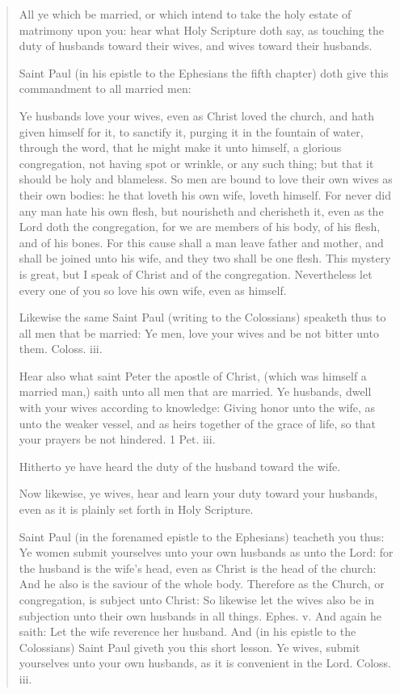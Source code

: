 \documentclass[
]{book}
\begin{document}
\begin{quote}
All ye which be married, or which intend to take the holy estate of matrimony upon you: hear what Holy Scripture doth say, as touching the duty of husbands toward their wives, and wives toward their husbands.

Saint Paul (in his epistle to the Ephesians the fifth chapter) doth give this commandment to all married men:

Ye husbands love your wives, even as Christ loved the church, and hath given himself for it, to sanctify it, purging it in the fountain of water, through the word, that he might make it unto himself, a glorious congregation, not having spot or wrinkle, or any such thing; but that it should be holy and blameless. So men are bound to love their own wives as their own bodies: he that loveth his own wife, loveth himself. For never did any man hate his own flesh, but nourisheth and cherisheth it, even as the Lord doth the congregation, for we are members of his body, of his flesh, and of his bones. For this cause shall a man leave father and mother, and shall be joined unto his wife, and they two shall be one flesh. This mystery is great, but I speak of Christ and of the congregation. Nevertheless let every one of you so love his own wife, even as himself.

Likewise the same Saint Paul (writing to the Colossians) speaketh thus to all men that be married: Ye men, love your wives and be not bitter unto them. Coloss. iii.

Hear also what saint Peter the apostle of Christ, (which was himself a married man,) saith unto all men that are married. Ye husbands, dwell with your wives according to knowledge: Giving honor unto the wife, as unto the weaker vessel, and as heirs together of the grace of life, so that your prayers be not hindered. 1 Pet. iii.

Hitherto ye have heard the duty of the husband toward the wife.

Now likewise, ye wives, hear and learn your duty toward your husbands, even as it is plainly set forth in Holy Scripture.

Saint Paul (in the forenamed epistle to the Ephesians) teacheth you thus: Ye women submit yourselves unto your own husbands as unto the Lord: for the husband is the wife's head, even as Christ is the head of the church: And he also is the saviour of the whole body. Therefore as the Church, or congregation, is subject unto Christ: So likewise let the wives also be in subjection unto their own husbands in all things. Ephes. v. And again he saith: Let the wife reverence her husband. And (in his epistle to the Colossians) Saint Paul giveth you this short lesson. Ye wives, submit yourselves unto your own husbands, as it is convenient in the Lord. Coloss. iii.


\end{quote}
\end{document}

